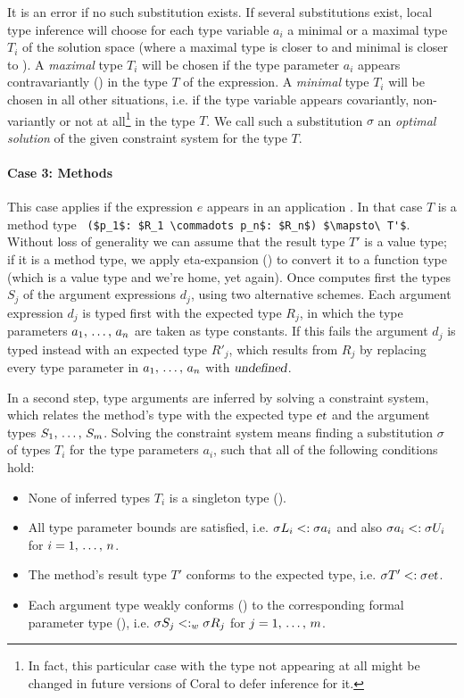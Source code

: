 It is an error if no such substitution exists. If several substitutions exist, local type inference will choose for each type variable $a_i$ a minimal or a maximal type $T_i$ of the solution space (where a maximal type is closer to  and minimal is closer to ). A {\em maximal} type $T_i$ will be chosen if the type parameter $a_i$ appears contravariantly () in the type $T$ of the expression. A {\em minimal} type $T_i$ will be chosen in all other situations, i.e. if the type variable appears covariantly, non-variantly or not at all\footnote{In fact, this particular case with the type not appearing at all might be changed in future versions of Coral to defer inference for it.} in the type $T$. We call such a substitution $\sigma$ an {\em optimal solution} of the given constraint system for the type $T$. 

\paragraph{Case 3: Methods}
This case applies if the expression $e$ appears in an application . In that case $T$ is a method type ~\lstinline!($p_1$: $R_1 \commadots p_n$: $R_n$) $\mapsto\ T'$!. Without loss of generality we can assume that the result type $T'$ is a value type; if it is a method type, we apply eta-expansion () to convert it to a function type (which is a value type and we're home, yet again). Once computes first the types $S_j$ of the argument expressions $d_j$, using two alternative schemes. Each argument expression $d_j$ is typed first with the expected type $R_j$, in which the type parameters $a_1 ,\, \ldots ,\, a_n$ are taken as type constants. If this fails the argument $d_j$ is typed instead with an expected type $R'_j$, which results from $R_j$ by replacing every type parameter in $a_1 ,\, \ldots ,\, a_n$ with $\mbox{\sl undefined}$. 

In a second step, type arguments are inferred by solving a constraint system, which relates the method's type with the expected type $\mbox{\sl et}$ and the argument types $S_1 ,\, \ldots ,\, S_m$. Solving the constraint system means finding a substitution $\sigma$ of types $T_i$ for the type parameters $a_i$, such that all of the following conditions hold:
\begin{itemize}
\item None of inferred types $T_i$ is a singleton type (). %
\item All type parameter bounds are satisfied, i.e. $\sigma L_i <: \sigma a_i$ and also $\sigma a_i <: \sigma U_i$ for $i = 1 ,\, \ldots ,\, n$. 
\item The method's result type $T'$ conforms to the expected type, i.e. $\sigma T' <: \sigma \mbox{\sl et}$. 
\item Each argument type weakly conforms () to the corresponding formal parameter type (), i.e. $\sigma S_j <: _w \sigma R_j$ for $j = 1 ,\, \ldots ,\, m$. 
\end{itemize}

